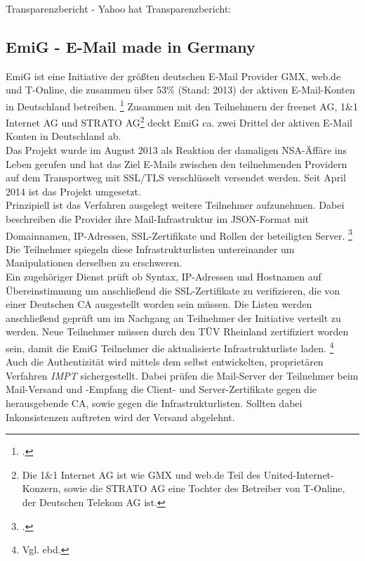 \documentclass  [paper=a4,
				fontsize=12pt,
				listof=totoc,
				bibliography=totoc
				]{scrreprt}
\begin{document}
			Transparenzbericht
			- Yahoo hat Transparenzbericht:
		
			\pagebreak
			\subsection{EmiG - E-Mail made in Germany}
			EmiG ist eine Initiative der größten deutschen E-Mail Provider GMX, web.de und T-Online, die zusammen über 53\% (Stand: 2013) der aktiven E-Mail-Konten in Deutschland betreiben.
			\footcite[Vgl.][]{Brandt13} 
			Zusammen mit den Teilnehmern der freenet AG, 1\&1 Internet AG und STRATO AG\footnote{Die 1\&1 Internet AG ist wie GMX und web.de Teil des United-Internet-Konzern, sowie die STRATO AG eine Tochter des Betreiber von T-Online, der Deutschen Telekom AG ist.} deckt EmiG ca. zwei Drittel der aktiven E-Mail Konten in Deutschland ab.\\
			Das Projekt wurde im August 2013 als Reaktion der damaligen NSA-Äffäre ins Leben gerufen und hat das Ziel E-Mails zwischen den teilnehmenden Providern auf dem Transportweg mit SSL/TLS verschlüsselt versendet werden.
			Seit April 2014 ist das Projekt umgesetzt.
			\medskip\\
			Prinzipiell ist das Verfahren ausgelegt weitere Teilnehmer aufzunehmen.
			Dabei beschreiben die Provider ihre Mail-Infrastruktur im JSON-Format mit \glqq Domainnamen, IP-Adressen, SSL-Zertifikate und Rollen der beteiligten Server.\grqq
			\footcite[Vgl.][]{Zivadino14-1}
			Die Teilnehmer spiegeln diese Infrastrukturlisten untereinander um Manipulationen derselben zu erschweren.\\
			Ein zugehöriger Dienst prüft ob Syntax, IP-Adressen und Hostnamen auf Übereinstimmung um anschließend die SSL-Zertifikate zu verifizieren, die von einer Deutschen CA ausgestellt worden sein müssen.
			Die Listen werden anschließend geprüft um im Nachgang an Teilnehmer der Initiative verteilt zu werden. 
			Neue Teilnehmer müssen durch den TÜV Rheinland zertifiziert worden sein, damit die EmiG Teilnehmer die aktualisierte Infrastrukturliste laden.
			\footnote{Vgl. ebd.}
			\medskip\\
			Auch die Authentizität wird mittels dem selbst entwickelten, proprietären Verfahren \textit{\ac{IMPT}} sichergestellt. 
			Dabei prüfen die Mail-Server der Teilnehmer beim Mail-Versand und -Empfang die Client- und Server-Zertifikate gegen die herausgebende CA, sowie gegen die Infrastrukturlisten.
			Sollten dabei Inkonsistenzen auftreten wird der Versand abgelehnt.\\
\end{document}
